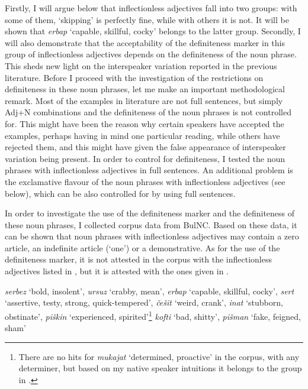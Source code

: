 \documentclass[output=paper]{langscibook}
\begin{document}
\noindent Firstly, I will argue below that inflectionless adjectives fall into two groups: with some of them, `skipping' is perfectly fine, while with others it is not. It will be shown that \emph{erbap} `capable, skillful, cocky' belongs to the latter group. Secondly, I will also demonstrate that the acceptability of the definiteness marker in this group of inflectionless adjectives depends on the definiteness of the noun phrase. This sheds new light on the interspeaker variation reported in the previous literature. Before I proceed with the investigation of the restrictions on definiteness in these noun phrases, let me make an important methodological remark. Most of the examples in literature \citep{Adamson2019PhD,Adamson2020,SpencerLuis2012,Halpern1995} are not full sentences, but simply Adj+N combinations and the definiteness of the noun phrases is not controlled for. This might have been the reason why certain speakers have accepted the examples, perhaps having in mind one particular reading, while others have rejected them, and this might have given the false appearance of interspeaker variation being present. In order to control for definiteness, I tested the noun phrases with inflectionless adjectives in full sentences. An additional problem is the exclamative flavour of the noun phrases with inflectionless adjectives (see below), which can be also controlled for by using full sentences. 

In order to investigate the use of the definiteness marker and the definiteness of these noun phrases, I collected corpus data from BulNC. Based on these data, it can be shown that noun phrases with inflectionless adjectives may contain a zero article, an indefinite article (`one') or a demonstrative. As for the use of the definiteness marker, it is not attested in the corpus with the inflectionless adjectives listed in , but it is attested with the ones given in .

\ea
\ea \label{ge-ex-list1} \emph{serbez} `bold, insolent', \emph{ursuz} `crabby, mean', \emph{erbap} `capable, skillful, cocky', \emph{sert} `assertive, testy, strong, quick-tempered', \emph{\v{c}e\v{s}it} `weird, crank', \emph{inat} `stubborn, obstinate', \emph{pi\v{s}kin} `experienced, spirited'\footnote{There are no hits for \emph{mukajat} `determined, proactive' in the corpus, with any determiner, but based on my native speaker intuitions it belongs to the group in .} %
\ex \label{ge-ex-list2} \emph{kofti} `bad, shitty', \emph{pi\v{s}man} `fake, feigned, sham' %
\z
\z
\end{document}
